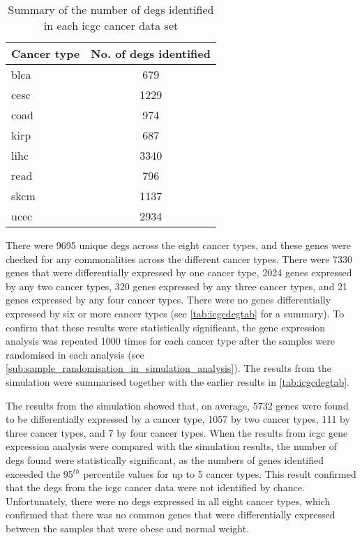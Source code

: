 \begin{table}[htbp]
	\centering
	\caption{Summary of the number of \glspl{deg} identified in each \gls{icgc} cancer data set}
	\label{tab:icgcdegnum}
	\begin{tabular}{lc}
		Cancer type & No. of \glspl{deg} identified\\
		\hline
		\rule{0pt}{2.25ex}\gls{blca} & 679 \\
		\gls{cesc} & 1229\\
		\gls{coad} & 974\\
		\gls{kirp} & 687\\
		\gls{lihc} & 3340\\
		\gls{read} & 796\\
		\gls{skcm} & 1137\\
		\gls{ucec} & 2934\\
		\hline
		\hline
	\end{tabular}
\end{table}

There were 9695 unique \glspl{deg} across the eight cancer types, and these genes were checked for any commonalities across the different cancer types.
There were 7330 genes that were differentially expressed by one cancer type, 2024 genes expressed by any two cancer types, 320 genes expressed by any three cancer types, and 21 genes expressed by any four cancer types.
There were no genes differentially expressed by six or more cancer types (see \cref{tab:icgcdegtab} for a summary).
To confirm that these results were statistically significant, the gene expression analysis was repeated 1000 times for each cancer type after the samples were randomised in each analysis (see \cref{sub:sample_randomisation_in_simulation_analysis}).
The results from the simulation were summarised together with the earlier results in \cref{tab:icgcdegtab}.

The results from the simulation showed that, on average, 5732 genes were found to be differentially expressed by a cancer type, 1057 by two cancer types, 111 by three cancer types, and 7 by four cancer types.
When the results from \gls{icgc} gene expression analysis were compared with the simulation results, the number of \glspl{deg} found were statistically significant, as the numbers of genes identified exceeded the 95$^{th}$ percentile values for up to 5 cancer types.
This result confirmed that the \glspl{deg} from the \gls{icgc} cancer data were not identified by chance.
Unfortunately, there were no \glspl{deg} expressed in all eight cancer types, which confirmed that there was no common genes that were differentially expressed between the samples that were obese and normal weight.

